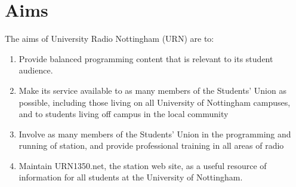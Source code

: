 \section{Aims}

The aims of University Radio Nottingham (URN) are to:

\begin{enumerate}[label*=\thesection.\arabic*.]
    \item Provide balanced programming content that is relevant to its student audience.
    \item Make its service available to as many members of the Students' Union as possible, including those living on all University of Nottingham campuses, and to students living off campus in the local community
    \item Involve as many members of the Students' Union in the programming and running of station, and provide professional training in all areas of radio
    \item Maintain URN1350.net, the station web site, as a useful resource of information for all students at the University of Nottingham.
\end{enumerate}
